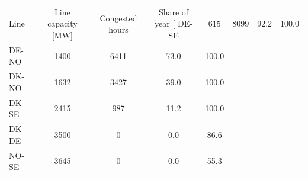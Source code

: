 \begin{tabular}{lcccc}
\toprule
Line & Line capacity [MW] & Congested hours & Share of year [%
\midrule
DE-SE & 615 & 8099 & 92.2 & 100.0 \\
DE-NO & 1400 & 6411 & 73.0 & 100.0 \\
DK-NO & 1632 & 3427 & 39.0 & 100.0 \\
DK-SE & 2415 & 987 & 11.2 & 100.0 \\
DK-DE & 3500 & 0 & 0.0 & 86.6 \\
NO-SE & 3645 & 0 & 0.0 & 55.3 \\
\bottomrule
\end{tabular}
